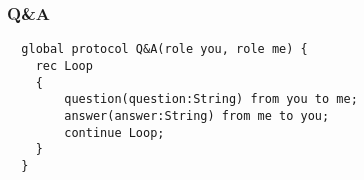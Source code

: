 %
%
%

\begin{frame}[fragile]\frametitle{Q\&A}
  \begin{lstlisting}
  global protocol Q&A(role you, role me) {
    rec Loop
    {
        question(question:String) from you to me;
        answer(answer:String) from me to you;
        continue Loop;
    }
  }
  \end{lstlisting}

\end{frame}
